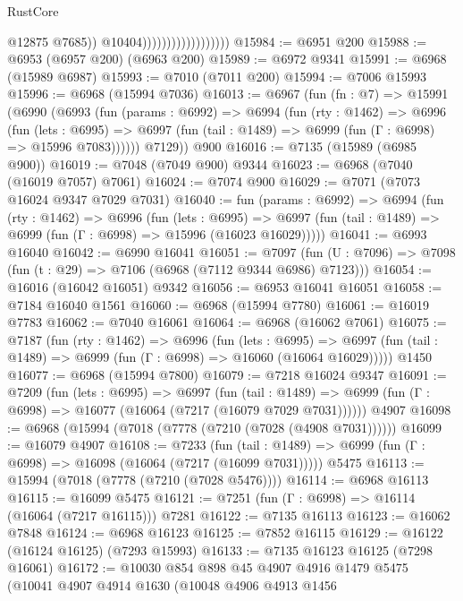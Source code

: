 \begin{lexlean}{RustCore}
\begin{coremodule}
                                            @12875
                                            @7685))
                                        @10404))))))))))))))))))
@15984 := @6951 @200
@15988 := @6953 (@6957 @200) (@6963 @200)
@15989 := @6972 @9341
@15991 := @6968 (@15989 @6987)
@15993 := @7010 (@7011 @200)
@15994 := @7006 @15993
@15996 := @6968 (@15994 @7036)
@16013 := @6967
    (fun (fn : @7) =>
    @15991
      (@6990
        (@6993
          (fun (params : @6992) =>
          @6994
            (fun (rty : @1462) =>
            @6996
              (fun (lets : @6995) =>
              @6997 (fun (tail : @1489) => @6999 (fun (Γ : @6998) => @15996 @7083))))))
        @7129))
    @900
@16016 := @7135 (@15989 (@6985 @900))
@16019 := @7048 (@7049 @900) @9344
@16023 := @6968 (@7040 (@16019 @7057) @7061)
@16024 := @7074 @900
@16029 := @7071 (@7073 @16024 @9347 @7029 @7031)
@16040 := fun (params : @6992) =>
  @6994
    (fun (rty : @1462) =>
    @6996
      (fun (lets : @6995) =>
      @6997 (fun (tail : @1489) => @6999 (fun (Γ : @6998) => @15996 (@16023 @16029)))))
@16041 := @6993 @16040
@16042 := @6990 @16041
@16051 := @7097
    (fun (U : @7096) => @7098 (fun (t : @29) => @7106 (@6968 (@7112 @9344 @6986) @7123)))
@16054 := @16016 (@16042 @16051) @9342
@16056 := @6953 @16041 @16051
@16058 := @7184 @16040 @1561
@16060 := @6968 (@15994 @7780)
@16061 := @16019 @7783
@16062 := @7040 @16061
@16064 := @6968 (@16062 @7061)
@16075 := @7187
    (fun (rty : @1462) =>
    @6996
      (fun (lets : @6995) =>
      @6997 (fun (tail : @1489) => @6999 (fun (Γ : @6998) => @16060 (@16064 @16029)))))
    @1450
@16077 := @6968 (@15994 @7800)
@16079 := @7218 @16024 @9347
@16091 := @7209
    (fun (lets : @6995) =>
    @6997
      (fun (tail : @1489) =>
      @6999 (fun (Γ : @6998) => @16077 (@16064 (@7217 (@16079 @7029 @7031))))))
    @4907
@16098 := @6968 (@15994 (@7018 (@7778 (@7210 (@7028 (@4908 @7031))))))
@16099 := @16079 @4907
@16108 := @7233
    (fun (tail : @1489) => @6999 (fun (Γ : @6998) => @16098 (@16064 (@7217 (@16099 @7031)))))
    @5475
@16113 := @15994 (@7018 (@7778 (@7210 (@7028 @5476))))
@16114 := @6968 @16113
@16115 := @16099 @5475
@16121 := @7251 (fun (Γ : @6998) => @16114 (@16064 (@7217 @16115))) @7281
@16122 := @7135 @16113
@16123 := @16062 @7848
@16124 := @6968 @16123
@16125 := @7852 @16115
@16129 := @16122 (@16124 @16125) (@7293 @15993)
@16133 := @7135 @16123 @16125 (@7298 @16061)
@16172 := @10030
    @854
    @898
    @45
    @4907
    @4916
    @1479
    @5475
    (@10041
      @4907
      @4914
      @1630
      (@10048
        @4906
        @4913
        @1456

\end{coremodule}
\end{lexlean}
